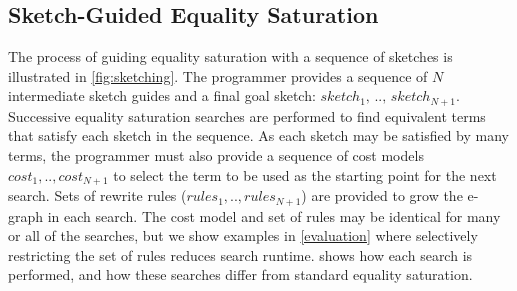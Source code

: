\subsection{Sketch-Guided Equality Saturation}
\label{sketching-sub}

The process of guiding equality saturation with a sequence of sketches is illustrated in \cref{fig:sketching}.
The programmer provides a sequence of $N$ intermediate sketch guides and a final goal sketch: $sketch_1,\,..,\,sketch_{N+1}$.
Successive equality saturation searches are performed to find equivalent terms that satisfy each sketch in the sequence. As each sketch may be satisfied by many terms, the programmer must also provide a sequence of cost models $cost_1, .., cost_{N+1}$ to select the term to be used as the starting point for the next search. Sets of rewrite rules ($rules_1, .., rules_{N+1}$) are provided to grow the e-graph in each search. The cost model and set of rules may be identical for many or all of the searches, but we show examples in \cref{evaluation} where selectively restricting the set of rules reduces search runtime.  shows how each search is performed, and how these searches differ from standard equality saturation.



